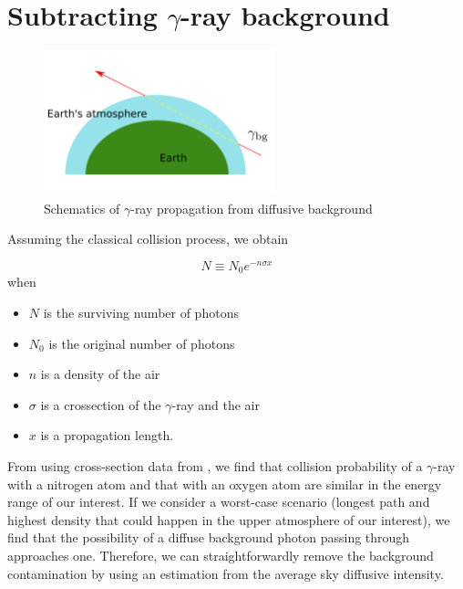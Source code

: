 \chapter{Subtracting $\gamma$-ray background}
\label{appendix:bg_subtraction}

\begin{figure}[h!]
    \centering
      \includegraphics[width=0.6\textwidth]{appendix/bg_subtraction/backgroundSubtract.pdf}
      \caption{Schematics of $\gamma$-ray propagation from diffusive background}
\end{figure}


Assuming
the classical collision process, we obtain

\begin{equation}
    N \equiv N_0 e^{-n\sigma x}
\end{equation}
when
\begin{itemize}
    \item $N$ is the surviving number of photons
    \item $N_0$ is the original number of photons    
    \item $n$ is a density of the air
    \item $\sigma$ is a crossection of the $\gamma$-ray and the air
    \item $x$ is a propagation length.
\end{itemize}
From using cross-section data from \cite{XCOMNIST},
we find that collision probability of a $\gamma$-ray
with a nitrogen atom and
that with an oxygen atom are
similar in
the energy range of our interest.
If we consider a worst-case scenario 
(longest path and highest density that could happen in 
the upper atmosphere of our interest),
we
find that the possibility of a diffuse background
photon passing through approaches one. 
Therefore, we can straightforwardly remove the background
contamination by using an estimation from the average sky
diffusive intensity.

